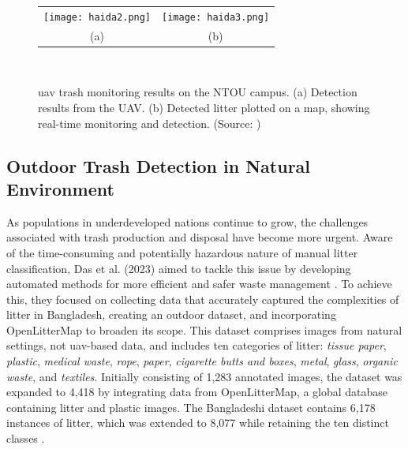 \begin{figure}[!htbp]
  \centering
  \begin{tabular}{cc}
    \texttt{[image: haida2.png]} &
    \texttt{[image: haida3.png]} \\
    \small (a) & \small (b) \\
  \end{tabular}\\
  \caption{\gls{uav} trash monitoring results on the NTOU campus. (a) Detection results from the UAV. (b) Detected litter plotted on a map, showing real-time monitoring and detection. (Source: \cite{haida})}
  \label{fig:haida2}
\end{figure}


\subsection{Outdoor Trash Detection in Natural Environment}
\label{subsec:3_bangladeshi}

As populations in underdeveloped nations continue to grow, the challenges associated with trash production and disposal have become more urgent. Aware of the time-consuming and potentially hazardous nature of manual litter classification, Das et al. (2023) aimed to tackle this issue by developing automated methods for more efficient and safer waste management \cite{bangladeshi}. To achieve this, they focused on collecting data that accurately captured the complexities of litter in Bangladesh, creating an outdoor dataset, and incorporating OpenLitterMap to broaden its scope. This dataset comprises images from natural settings, not \gls{uav}-based data, and includes ten categories of litter: \textit{tissue paper}, \textit{plastic}, \textit{medical waste}, \textit{rope}, \textit{paper}, \textit{cigarette butts and boxes}, \textit{metal}, \textit{glass}, \textit{organic waste}, and \textit{textiles}. Initially consisting of 1,283 annotated images, the dataset was expanded to 4,418 by integrating data from OpenLitterMap, a global database containing litter and plastic images. The Bangladeshi dataset contains 6,178 instances of litter, which was extended to 8,077 while retaining the ten distinct classes \cite{bangladeshi}.

